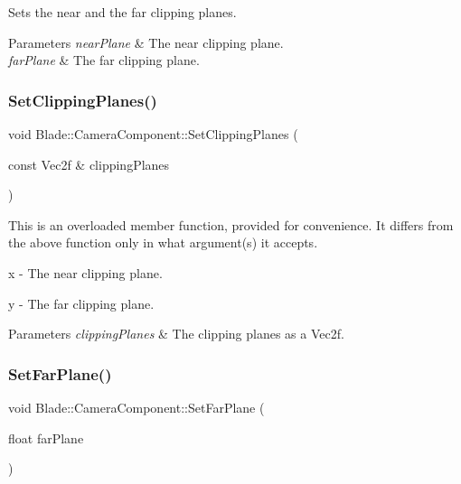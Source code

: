 Sets the near and the far clipping planes. 


\begin{DoxyParams}{Parameters}
{\em near\+Plane} & The near clipping plane. \\
\hline
{\em far\+Plane} & The far clipping plane. \\
\hline
\end{DoxyParams}
\mbox{\label{class_blade_1_1_camera_component_a30416422c87afed3e80a26b14215948f}} 
\subsubsection{\texorpdfstring{Set\+Clipping\+Planes()}{SetClippingPlanes()}\hspace{0.1cm}{\footnotesize\ttfamily [2/2]}}
{\footnotesize\ttfamily void Blade\+::\+Camera\+Component\+::\+Set\+Clipping\+Planes (\begin{DoxyParamCaption}\item[{const Vec2f \&}]{clipping\+Planes }\end{DoxyParamCaption})\hspace{0.3cm}{\ttfamily [noexcept]}}

This is an overloaded member function, provided for convenience. It differs from the above function only in what argument(s) it accepts.

x -\/ The near clipping plane.

y -\/ The far clipping plane. 
\begin{DoxyParams}{Parameters}
{\em clipping\+Planes} & The clipping planes as a Vec2f. \\
\hline
\end{DoxyParams}
\mbox{\label{class_blade_1_1_camera_component_a431e7ecb3e2c4302cb1d07c07cb89dc4}} 
\subsubsection{\texorpdfstring{Set\+Far\+Plane()}{SetFarPlane()}}
{\footnotesize\ttfamily void Blade\+::\+Camera\+Component\+::\+Set\+Far\+Plane (\begin{DoxyParamCaption}\item[{float}]{far\+Plane }\end{DoxyParamCaption})\hspace{0.3cm}{\ttfamily [noexcept]}}



